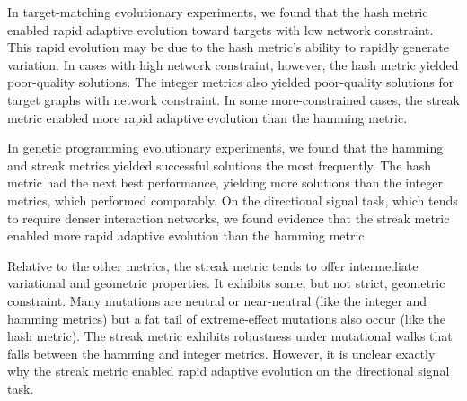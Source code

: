 In target-matching evolutionary experiments, we found that the hash metric enabled rapid adaptive evolution toward targets with low network constraint.
This rapid evolution may be due to the hash metric's ability to rapidly generate variation.
In cases with high network constraint, however, the hash metric yielded poor-quality solutions.
The integer metrics also yielded poor-quality solutions for target graphs with network constraint.
In some more-constrained cases, the streak metric enabled more rapid adaptive evolution than the hamming metric.


In genetic programming evolutionary experiments, we found that the hamming and streak metrics yielded successful solutions the most frequently.
The hash metric had the next best performance, yielding more solutions than the integer metrics, which performed comparably.
On the directional signal task, which tends to require denser interaction networks, we found evidence that the streak metric enabled more rapid adaptive evolution than the hamming metric.

Relative to the other metrics, the streak metric tends to offer intermediate variational and geometric properties.
It exhibits some, but not strict, geometric constraint.
Many mutations are neutral or near-neutral (like the integer and hamming metrics) but a fat tail of extreme-effect mutations also occur (like the hash metric).
The streak metric exhibits robustness under mutational walks that falls between the hamming and integer metrics. 
However, it is unclear exactly why the streak metric enabled rapid adaptive evolution on the directional signal task.



